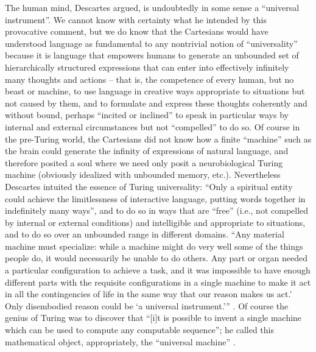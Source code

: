\documentclass[output=paper]{langsci/langscibook}
\begin{document}
The human mind, Descartes argued, is undoubtedly in some sense a “universal
instrument”. We cannot know with certainty what he intended by this provocative
comment, but we do know that the Cartesians would have understood language as
fundamental to any nontrivial notion of “universality” because it is language
that empowers humans to generate an unbounded set of hierarchically structured
expressions that can enter into effectively infinitely many thoughts and
actions – that is, the competence of every human, but no beast or machine, to
use language in creative ways appropriate to situations but not caused by them,
and to formulate and express these thoughts coherently and without bound,
perhaps “incited or inclined” to speak in particular ways by internal and
external circumstances but not “compelled” to do so. Of course in the
pre-Turing world, the Cartesians did not know how a finite “machine” such as
the brain could generate the infinity of expressions of natural language, and
therefore posited a soul where we need only posit a neurobiological Turing
machine (obviously idealized with unbounded memory, etc.). Nevertheless
Descartes intuited the essence of Turing universality: “Only a spiritual entity
could achieve the limitlessness of interactive language, putting words together
in indefinitely many ways”, and to do so in ways that are “free” (i.e., not
compelled by internal or external conditions) and intelligible and appropriate
to situations, and to do so over an unbounded range in different domains. “Any
material machine must specialize: while a machine might do very well some of
the things people do, it would necessarily be unable to do others. Any part or
organ needed a particular configuration to achieve a task, and it was
impossible to have enough different parts with the requisite configurations in
a single machine to make it act in all the contingencies of life in the same
way that our reason makes us act.’ Only disembodied reason could be ‘a
universal instrument.’” \citep[63]{Riskin2017}. Of course the genius of Turing
was to discover that “[i]t is possible to invent a single machine which can be
used to compute any computable sequence”; he called this mathematical object,
appropriately, the “universal machine” \citep[243]{Turing1936}.
\end{document}
